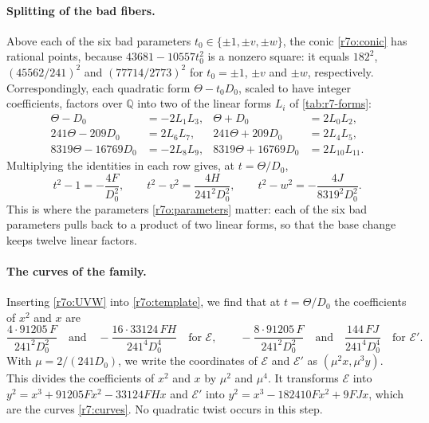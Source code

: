 \documentclass[12pt,oneside,openany]{book}
\theoremstyle{definition}
\theoremstyle{plain}
\numberwithin{equation}{chapter}
\theoremstyle{plain}
\theoremstyle{definition}
\theoremstyle{remark}
\newcommand{\Q}{\mathbb Q}
\begin{document}
\paragraph{Splitting of the bad fibers.} Above each of the six bad
parameters $t_0\in\{\pm1,\pm v,\pm w\}$, the conic \eqref{r7o:conic} has
rational points, because $43681-10557t_0^2$ is a nonzero square: it equals
$182^2$, $(45562/241)^2$ and $(77714/2773)^2$ for $t_0=\pm1$, $\pm v$ and
$\pm w$, respectively. Correspondingly, each quadratic form $\Theta-t_0D_0$,
scaled to have integer coefficients, factors over $\Q$ into two of the
linear forms $L_i$ of \cref{tab:r7-forms}:
\begin{equation}\label{r7o:pullbacks}
\begin{aligned}
 \Theta-D_0&=-2L_1L_3, & \Theta+D_0&=2L_0L_2,\\
 241\Theta-209D_0&=2L_6L_7, & 241\Theta+209D_0&=2L_4L_5,\\
 8319\Theta-16769D_0&=-2L_8L_9, & 8319\Theta+16769D_0&=2L_{10}L_{11}.
\end{aligned}
\end{equation}
Multiplying the identities in each row gives, at $t=\Theta/D_0$,
\begin{equation}\label{r7o:UVW}
 t^2-1=-\frac{4F}{D_0^2},\qquad t^2-v^2=\frac{4H}{241^2D_0^2},\qquad
 t^2-w^2=-\frac{4J}{8319^2D_0^2}.
\end{equation}
This is where the parameters \eqref{r7o:parameters} matter: each of the six
bad parameters pulls back to a product of two linear forms, so that the
base change keeps twelve linear factors.

\paragraph{The curves of the family.} Inserting \eqref{r7o:UVW} into
\eqref{r7o:template}, we find that at $t=\Theta/D_0$ the coefficients of
$x^2$ and $x$ are
\[
 \frac{4\cdot91205\,F}{241^2D_0^2}\quad\text{and}\quad
 -\frac{16\cdot33124\,FH}{241^4D_0^4}\quad\text{for }\mathcal E,\qquad
 -\frac{8\cdot91205\,F}{241^2D_0^2}\quad\text{and}\quad
 \frac{144\,FJ}{241^4D_0^4}\quad\text{for }\mathcal E'.
\]
With $\mu=2/(241D_0)$, we write the coordinates of $\mathcal E$ and
$\mathcal E'$ as $(\mu^2x,\mu^3y)$. This divides the coefficients of $x^2$
and $x$ by $\mu^2$ and $\mu^4$. It transforms $\mathcal E$ into
$y^2=x^3+91205Fx^2-33124FHx$ and $\mathcal E'$ into
$y^2=x^3-182410Fx^2+9FJx$, which are the curves \eqref{r7:curves}. No
quadratic twist occurs in this step.
\end{document}
